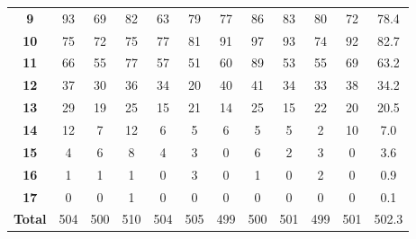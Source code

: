 \documentclass[11pt]{article}
\begin{document}
\begin{table}[H]
\begin{tabular}{cccccccccccc}
\textbf{9}                                                         & 93         & 69         & 82         & 63         & 79         & 77         & 86         & 83         & 80         & 72          & 78.4             \\
\textbf{10}                                                        & 75         & 72         & 75         & 77         & 81         & 91         & 97         & 93         & 74         & 92          & 82.7             \\
\textbf{11}                                                        & 66         & 55         & 77         & 57         & 51         & 60         & 89         & 53         & 55         & 69          & 63.2             \\
\textbf{12}                                                        & 37         & 30         & 36         & 34         & 20         & 40         & 41         & 34         & 33         & 38          & 34.2             \\
\textbf{13}                                                        & 29         & 19         & 25         & 15         & 21         & 14         & 25         & 15         & 22         & 20          & 20.5             \\
\textbf{14}                                                        & 12         & 7          & 12         & 6          & 5          & 6          & 5          & 5          & 2          & 10          & 7.0              \\
\textbf{15}                                                        & 4          & 6          & 8          & 4          & 3          & 0          & 6          & 2          & 3          & 0           & 3.6              \\
\textbf{16}                                                        & 1          & 1          & 1          & 0          & 3          & 0          & 1          & 0          & 2          & 0           & 0.9              \\
\textbf{17}                                                        & 0          & 0          & 1          & 0          & 0          & 0          & 0          & 0          & 0          & 0           & 0.1              \\
\textbf{Total}                                                     & 504        & 500        & 510        & 504        & 505        & 499        & 500        & 501        & 499        & 501         & 502.3           
\end{tabular}
\end{table}
\end{document}
